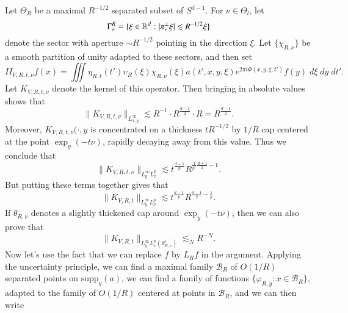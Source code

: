 \begin{comment}
Now let $\mathcal{B}_R$ denote a maximal $\sim 1/R$ separated subset of $\text{supp}_x(a)$. Then, by the uncertainty principle, we can find smooth functions $\{ \chi_{R,x} \}$ adapted to the family of $O(R)$ balls with centers in $\mathcal{B}_R$, and constants $\{ m_x \}$ such that
%
\[ K_{R,t}(x,y) = \sum_{x_0 \in \mathcal{B}_R} m_{x_0} \chi_{R,x_0}(x) K_{R,t}(x,y), \]
%
where $K_{R,t,x_0}(x,y) = $

 We perform a further decomposition, writing
%
\[ II_{W,R} = \sum_{t_0 \in \mathcal{T}_R} \sum_{x_0 \in \mathcal{B}_R} c_{t_0,x_0} II_{W,R,t_0,x_0}, \]
%
where
%
\[ II_{W,R,t_0,x_0} f(x) = \int \int_U \eta_{R,t_0}(t) \chi_{R,x_0}(x) K_{R,t}(x,y) f(y)\; dy\; dt, \]
%
\end{comment}

Let $\Theta_R$ be a maximal $R^{-1/2}$ separated subset of $S^{d-1}$. For $\nu \in \Theta_l$, let
%
\[ \Gamma^R_\nu = \{ \xi \in \operatorname{\mathbb{R}}^d: | \pi^\perp_\nu \xi | \lesssim R^{-1/2} \xi \} \]
%
denote the sector with aperture $\sim R^{-1/2}$ pointing in the direction $\xi$. Let $\{ \chi_{R,\nu} \}$ be a smooth partition of unity adapted to these sectors, and then set
%
\[ II_{V,R,t,\nu} f(x) = \iiint \eta_{R,t}(t') \upsilon_R(\xi) \chi_{R,\nu}(\xi) a(t',x,y, \xi) e^{2 \pi i \Phi(x,y,\xi,t')} f(y) \; d\xi\; dy\; dt'. \]
%
Let $K_{V,R,t,\nu}$ denote the kernel of this operator. Then bringing in absolute values shows that
%
\[ \| K_{V,R,t,\nu} \|_{L^\infty_{x,y}} \lesssim R^{-1} \cdot R^{\frac{d-1}{2}} \cdot R = R^{\frac{d-1}{2}}.  \]
%
Moreover, $K_{V,R,t,\nu}(\cdot, y$ is concentrated on a thickness $t R^{-1/2}$ by $1/R$ cap centered at the point $\exp_y(- t \nu)$, rapidly decaying away from this value. Thus we conclude that
%
\[ \| K_{V,R,t,\nu} \|_{L^\infty_y L^p_x} \lesssim t^{\frac{d-1}{p}} R^{\frac{1}{p^*} \frac{d+1}{2} - 1}. \]
%
But putting these terms together gives that
%
\[ \| K_{V,R,t} \|_{L^\infty_y L^p_x} \lesssim t^{\frac{d-1}{p}} R^{\frac{d-1}{2} - \frac{1}{p}}.\]
%
If $\theta_{R,\nu}$ denotes a slightly thickened cap around $\exp_y(- t \nu)$, then we can also prove that
%
\[ \| K_{V,R,t} \|_{L^\infty_y L^p_x(\theta_{R,\nu}^c)} \lesssim_N R^{-N}. \]
%
Now let's use the fact that we can replace $f$ by $L_R f$ in the argument. Applying the uncertainty principle, we can find a maximal family $\mathcal{B}_R$ of $O(1/R)$ separated points on $\text{supp}_y(a)$, we can find a family of functions $\{ \varphi_{R,y}: x \in \mathcal{B}_R \}$, adapted to the family of $O(1/R)$ centered at points in $\mathcal{B}_R$, and we can then write
